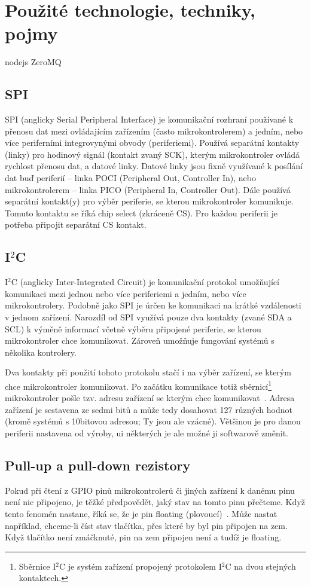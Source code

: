 \chapter{Použité technologie, techniky, pojmy}
nodejs
ZeroMQ

\section{SPI}\label{sec:spi}
SPI (anglicky Serial Peripheral Interface) je komunikační rozhraní používané k přenosu dat mezi ovládajícím zařízením (často mikrokontrolerem) a jedním, nebo více periferními integrovynými obvody (periferiemi).
Používá separátní kontakty (linky) pro hodinový signál (kontakt zvaný SCK), kterým mikrokontroler ovládá rychlost přenosu dat, a datové linky.
Datové linky jsou fixně využívané k posílání dat buď periferií -- linka POCI (Peripheral Out, Controller In), nebo mikrokontrolerem -- linka PICO (Peripheral In, Controller Out).
Dále používá separátní kontakt(y) pro výběr periferie, se kterou mikrokontroler komunikuje. Tomuto kontaktu se říká chip select (zkráceně CS). Pro každou periferii je potřeba připojit separátní CS kontakt.~\cite{sparkfun-spi}

\section{I$^{2}$C}
I$^{2}$C (anglicky Inter-Integrated Circuit) je komunikační protokol umožňující komunikaci mezi jednou nebo více periferiemi a jedním, nebo více mikrokontrolery.
Podobně jako SPI je úrčen ke komunikaci na krátké vzdálenosti v jednom zařízení.
Narozdíl od SPI využívá pouze dva kontakty (zvané SDA a SCL) k výměně informací včetně výběru připojené periferie, se kterou mikrokontroler chce komunikovat.
Zároveň umožňuje fungování systémů s několika kontrolery.~\cite{sparkfun-i2c}

Dva kontakty při použití tohoto protokolu stačí i na výběr zařízení, se kterým chce mikrokontroler komunikovat.
Po začátku komunikace totiž sběrnicí\footnote{Sběrnice I$^{2}$C je systém zařízení propojený protokolem I$^{2}$C na dvou stejných kontaktech.} mikrokontroler pošle tzv. adresu zařízení se kterým chce komunikovat~\cite{sparkfun-i2c}.
Adresa zařízení je sestavena ze sedmi bitů a může tedy dosahovat 127 různých hodnot (kromě systémů s 10bitovou adresou; Ty jsou ale vzácné).
Většinou je pro danou periferii nastavena od výroby, ui některých je ale možné ji softwarově změnit.

\section{Pull-up a pull-down rezistory}
Pokud při čtení z GPIO pinů mikrokontrolerů či jiných zařízení k danému pinu není nic připojeno, je těžké předpovědět, jaký stav na tomto pinu přečteme.
Když tento fenomén nastane, říká se, že je pin floating (plovoucí)~\cite{sparkfun-pud}.
Může nastat například, chceme-li číst stav tlačítka, přes které by byl pin připojen na zem. Když tlačítko není zmáčknuté, pin na zem připojen není a tudíž je floating.

